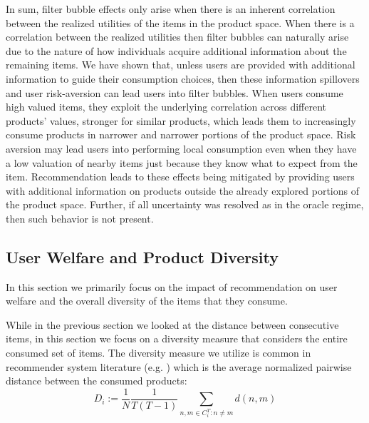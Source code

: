 \documentclass[format=acmsmall, review=false]{acmart}
\begin{document}
In sum, filter bubble effects only arise when there is an inherent correlation between the realized utilities of the items in the product space. When there is a correlation between the realized utilities then filter bubbles can naturally arise due to the nature of how individuals acquire additional information about the remaining items. We have shown that, unless users are provided with additional information to guide their consumption choices, then these information spillovers and user risk-aversion can lead users into filter bubbles. When users consume high valued items, they exploit the underlying correlation across different products' values, stronger for similar products, which leads them to increasingly consume products in narrower and narrower portions of the product space. Risk aversion may lead users into performing local consumption even when they have a low valuation of nearby items just because they know what to expect from the item. Recommendation leads to these effects being mitigated by providing users with additional information on products outside the already explored portions of the product space. Further, if all uncertainty was resolved as in the oracle regime, then such behavior is not present.

\subsection{User Welfare and Product Diversity}
In this section we primarily focus on the impact of recommendation on user welfare and the overall diversity of the items that they consume.
\par 
While in the previous section we looked at the distance between consecutive items, in this section we focus on a diversity measure that considers the entire consumed set of items. The diversity measure we utilize is common in recommender system literature (e.g. \cite{ziegler2005improving}) which is the average normalized pairwise distance between the consumed products:
$$D_i:=\frac{1}{N}\frac{1}{T(T-1)}\sum_{n,m \in C_i^T: n \ne m} d(n,m)$$
\end{document}
